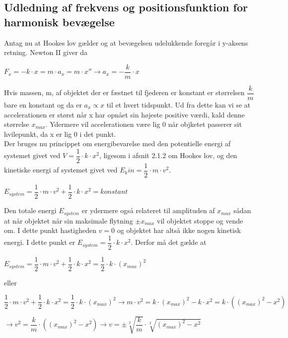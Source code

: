 \subsection{Udledning af frekvens og positionsfunktion for harmonisk bevægelse}

Antag nu at Hookes lov gælder og at bevægelsen udelukkende foregår i y-aksens retning. Newton II giver da 

\bigskip

\begin{center}
$F_x = -k \cdot x = m \cdot a_x = m \cdot x'' \rightarrow a_x = -\dfrac{k}{m} \cdot x$
\end{center}

\bigskip

Hvis massen, m, af objektet der er fæstnet til fjederen er konstant er størrelsen $\dfrac{k}{m}$ bare en konstant og da er $a_x \propto x$ til et hvert tidspunkt. Ud fra dette kan vi se at accelerationen er størst når x har opnået sin højeste positive værdi, kald denne størrelse $x_{max}$. Ydermere vil accelerationen være lig 0 når objketet passerer sit hvilepunkt, da x er lig 0 i det punkt.
\\

Der bruges nu princippet om energibevarelse med den potentielle energi af systemet givet ved $V=\dfrac{1}{2} \cdot k \cdot x^2$, ligesom i afsnit 2.1.2 om Hookes lov, og den kinetiske energi af systemet givet ved $E_kin = \dfrac{1}{2} \cdot m \cdot v^2$.

\bigskip

\begin{center}
$E_{system}=\dfrac{1}{2} \cdot m \cdot v^2 + \dfrac{1}{2} \cdot k \cdot x^2 = konstant$
\end{center}

Den totale energi $E_{system}$ er ydermere også relateret til amplituden af $x_{max}$ sådan at når objektet når sin maksimale flytning $\pm x_{max}$ vil objektet stoppe og vende om. I dette punkt hastigheden $v = 0$ og objektet har altså ikke nogen kinetisk energi. I dette punkt er $E_{system } = \dfrac{1}{2} \cdot k \cdot x^2$. Derfor må det gælde at

\bigskip
\begin{center}
$E_{system}=\dfrac{1}{2} \cdot m \cdot v^2 + \dfrac{1}{2} \cdot k \cdot x^2 = \dfrac{1}{2} \cdot k \cdot (x_{max})^2$
\end{center}
\bigskip

eller 

\bigskip
\begin{center}
$\dfrac{1}{2} \cdot m \cdot v^2 + \dfrac{1}{2} \cdot k \cdot x^2 = \dfrac{1}{2} \cdot k \cdot (x_{max})^2 \rightarrow m \cdot v^2 = k \cdot (x_{max})^2 - k \cdot x^2 = k \cdot ((x_{max})^2 - x^2)$

$\rightarrow v^2 = \dfrac{k}{m} \cdot ((x_{max})^2 - x^2) \rightarrow v = \pm \sqrt[2]{\dfrac{k}{m}} \cdot \sqrt[2]{(x_{max})^2-x^2}$
\end{center}
\bigskip


